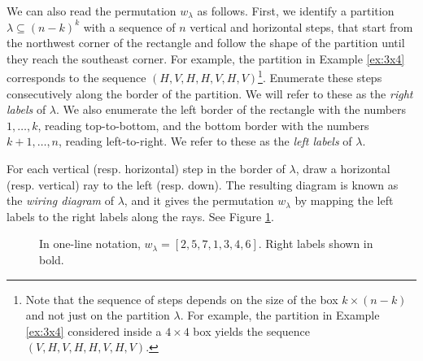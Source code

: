 \documentclass[10pt]{amsart}
\theoremstyle{plain}
\theoremstyle{definition}
\theoremstyle{remark}
\numberwithin{equation}{section}
\newcommand{\la}{\lambda}
\newcommand{\MG}[1]{{\color{teal}{{\bf Misha}: #1}}}
\begin{document}
We can also read the permutation $w_{\lambda}$ as follows. First, we identify a partition $\lambda \subseteq (n-k)^{k}$ with a sequence of $n$ vertical and horizontal steps, that start from the northwest corner of the rectangle and follow the shape of the partition until they reach the southeast corner. For example, the partition in Example \ref{ex:3x4} corresponds to the sequence $(H, V, H, H, V, H, V)$\footnote{Note that the sequence of steps depends on the size of the box $k \times (n-k)$ and not just on the partition $\la$. For example, the partition in Example \ref{ex:3x4} considered inside a $4 \times 4$ box yields the sequence $(V, H, V, H, H, V, H, V)$.}. Enumerate these steps consecutively along the border
of the partition. We will refer to these as the {\em right labels} of $\lambda$. We also enumerate the left border of the rectangle with the numbers $1, \dots, k$, reading top-to-bottom, and the bottom border with the numbers $k+1, \dots, n$, reading left-to-right. We refer to these as the {\em left labels} of $\lambda$.

For each vertical (resp. horizontal) step in the border of $\la$, draw a horizontal (resp. vertical) ray to the left (resp. down). The resulting diagram is known as the \emph{wiring diagram} of $\lambda$, and it gives the permutation $w_{\lambda}$ by mapping the left labels to the right labels
along the rays. 
See Figure \ref{fig:3x4}.

\begin{center}
    \begin{figure}[ht]
  \caption{
  In one-line notation, $w_{\lambda} = [2,5,7,1,3,4,6]$. Right labels shown in bold.}
  \label{fig:3x4}
    \end{figure}
\end{center}
\end{document}

